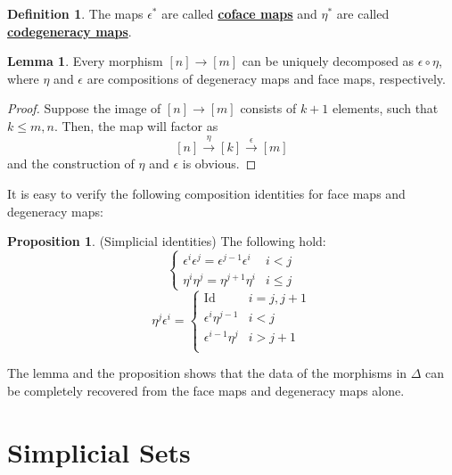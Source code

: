 \documentclass{article}
\theoremstyle{definition}
\theoremstyle{definition}
\newtheorem{definition}{Definition}[theorem]
\theoremstyle{definition}
\theoremstyle{definition}
\newtheorem{proposition}{Proposition}[theorem]
\theoremstyle{definition}
\newtheorem{lemma}[theorem]{Lemma}
\theoremstyle{definition}
\theoremstyle{definition}
\begin{document}
\begin{tcolorbox}[colback=purple!5!white,colframe=purple!75!black]
\begin{definition}
The maps $\epsilon^*$ are called \underline{\textbf{coface maps}} and $\eta^*$ are called \underline{\textbf{codegeneracy maps}}.
\end{definition}
\end{tcolorbox}

\begin{tcolorbox}
\begin{lemma}
Every morphism $[n]\to [m]$ can be uniquely decomposed as $\epsilon\circ \eta$, where $\eta$ and $\epsilon$ are compositions of degeneracy maps and face maps, respectively. 
\end{lemma}
\end{tcolorbox}
\begin{proof}
    Suppose the image of $[n]\to [m]$ consists of $k+1$ elements, such that $k\leq m,n$. Then, the map will factor as 
    \[[n]\xrightarrow{\eta} [k]\xrightarrow{\epsilon} [m]\]
    and the construction of $\eta$ and $\epsilon$ is obvious. 
\end{proof}
 It is easy to verify the following composition identities for face maps and degeneracy maps:

\begin{tcolorbox}[colback=blue!5!white,colframe=blue!30!white]
\begin{proposition}
(Simplicial identities) The following hold: 
\[\begin{cases}
   \epsilon^i\epsilon^j=\epsilon^{j-1}\epsilon^i &  i<j\\
    \eta^i\eta^j=\eta^{j+1}\eta^i &  i\leq j
\end{cases}\]
\[\eta^j\epsilon^i=\begin{cases}
   \textrm{Id}  &  i=j,j+1\\
   \epsilon^i\eta^{j-1} & i<j\\ 
   \epsilon^{i-1}\eta^{j} & i>j+1\\ 
\end{cases}\]
\end{proposition}
\end{tcolorbox}

The lemma and the proposition shows that the data of the morphisms in $\Delta$ can be completely recovered from the face maps and degeneracy maps alone. 

\section{Simplicial Sets}
\end{document}
